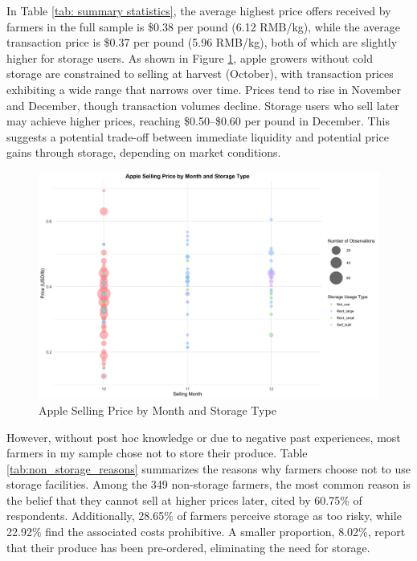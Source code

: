 \documentclass[12pt]{article}
\begin{document}


In Table \ref{tab: summary statistics}, the average highest price offers received by farmers in the full sample is \$0.38 per pound (6.12 RMB/kg), while the average transaction price is \$0.37 per pound (5.96 RMB/kg), both of which are slightly higher for storage users. As shown in Figure \ref{Figure: selling price bubble}, apple growers without cold storage are constrained to selling at harvest (October), with transaction prices exhibiting a wide range that narrows over time. Prices tend to rise in November and December, though transaction volumes decline. Storage users who sell later may achieve higher prices, reaching \$0.50–\$0.60 per pound in December. This suggests a potential trade-off between immediate liquidity and potential price gains through storage, depending on market conditions.

\begin{figure}[H]
\centering
\includegraphics[width=1\textwidth]{figures/apple_price_bubble_plot.png}
\caption{Apple Selling Price by Month and Storage Type}
\label{Figure: selling price bubble}
\end{figure}

However, without post hoc knowledge or due to negative past experiences, most farmers in my sample chose not to store their produce. Table \ref{tab:non_storage_reasons} summarizes the reasons why farmers choose not to use storage facilities. Among the 349 non-storage farmers, the most common reason is the belief that they cannot sell at higher prices later, cited by 60.75\% of respondents. Additionally, 28.65\% of farmers perceive storage as too risky, while 22.92\% find the associated costs prohibitive. A smaller proportion, 8.02\%, report that their produce has been pre-ordered, eliminating the need for storage.
\end{document}
